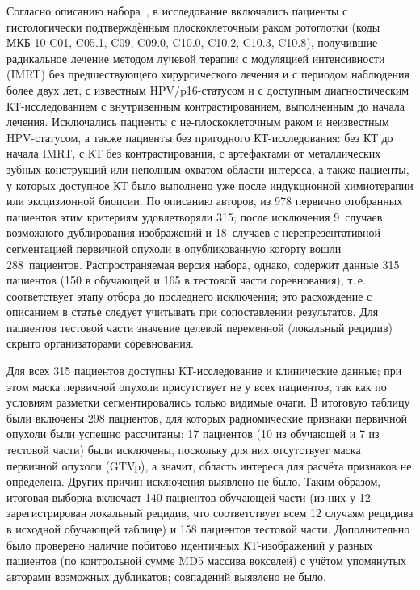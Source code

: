 \documentclass[11pt,a4paper]{article}
\newcommand{\Ntotal}{315}
\newcommand{\Ntrain}{150}
\newcommand{\Ntest}{165}
\newcommand{\Nok}{298}
\newcommand{\Nskip}{17}
\begin{document}
Согласно описанию набора~\cite{elhalawani2017}, в исследование включались пациенты с гистологически подтверждённым плоскоклеточным раком ротоглотки (коды МКБ-10 C01, C05.1, C09, C09.0, C10.0, C10.2, C10.3, C10.8), получившие радикальное лечение методом лучевой терапии с модуляцией интенсивности (IMRT) без предшествующего хирургического лечения и с периодом наблюдения более двух лет, с известным HPV/p16-статусом и с доступным диагностическим КТ-исследованием с внутривенным контрастированием, выполненным до начала лечения. Исключались пациенты с не-плоскоклеточным раком и неизвестным HPV-статусом, а также пациенты без пригодного КТ-исследования: без КТ до начала IMRT, с КТ без контрастирования, с артефактами от металлических зубных конструкций или неполным охватом области интереса, а также пациенты, у которых доступное КТ было выполнено уже после индукционной химиотерапии или эксцизионной биопсии. По описанию авторов, из 978 первично отобранных пациентов этим критериям удовлетворяли 315; после исключения 9~случаев возможного дублирования изображений и 18~случаев с нерепрезентативной сегментацией первичной опухоли в опубликованную когорту вошли 288~пациентов. Распространяемая версия набора, однако, содержит данные \Ntotal{} пациентов (\Ntrain{} в обучающей и \Ntest{} в тестовой части соревнования), т.\,е. соответствует этапу отбора до последнего исключения; это расхождение с описанием в статье следует учитывать при сопоставлении результатов. Для пациентов тестовой части значение целевой переменной (локальный рецидив) скрыто организаторами соревнования.

Для всех \Ntotal{} пациентов доступны КТ-исследование и клинические данные; при этом маска первичной опухоли присутствует не у всех пациентов, так как по условиям разметки сегментировались только видимые очаги. В итоговую таблицу были включены \Nok{} пациентов, для которых радиомические признаки первичной опухоли были успешно рассчитаны; \Nskip{} пациентов (10 из обучающей и 7 из тестовой части) были исключены, поскольку для них отсутствует маска первичной опухоли (GTVp), а значит, область интереса для расчёта признаков не определена. Других причин исключения выявлено не было. Таким образом, итоговая выборка включает 140 пациентов обучающей части (из них у 12 зарегистрирован локальный рецидив, что соответствует всем 12 случаям рецидива в исходной обучающей таблице) и 158 пациентов тестовой части. Дополнительно было проверено наличие побитово идентичных КТ-изображений у разных пациентов (по контрольной сумме MD5 массива вокселей) с учётом упомянутых авторами возможных дубликатов; совпадений выявлено не было.
\end{document}
